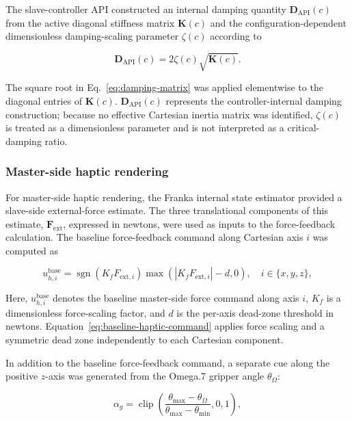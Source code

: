 The slave-controller API constructed an internal damping quantity $\mathbf{D}_{\mathrm{API}}(c)$ from the active diagonal stiffness matrix $\mathbf{K}(c)$ and the configuration-dependent dimensionless damping-scaling parameter $\zeta(c)$ according to

\begin{equation}
\label{eq:damping-matrix}
\mathbf{D}_{\mathrm{API}}(c)=2\zeta(c)\sqrt{\mathbf{K}(c)}.
\end{equation}

The square root in Eq.~\eqref{eq:damping-matrix} was applied elementwise to the diagonal entries of $\mathbf{K}(c)$. $\mathbf{D}_{\mathrm{API}}(c)$ represents the controller-internal damping construction; because no effective Cartesian inertia matrix was identified, $\zeta(c)$ is treated as a dimensionless parameter and is not interpreted as a critical-damping ratio.

\subsubsection{Master-side haptic rendering}
For master-side haptic rendering, the Franka internal state estimator provided a slave-side external-force estimate. The three translational components of this estimate, $\mathbf{F}_{\mathrm{ext}}$, expressed in newtons, were used as inputs to the force-feedback calculation. The baseline force-feedback command along Cartesian axis $i$ was computed as

\begin{equation}
\label{eq:baseline-haptic-command}
u_{h,i}^{\mathrm{base}}=
\operatorname{sgn}\!\left(K_fF_{\mathrm{ext},i}\right)
\max\!\left(\left|K_fF_{\mathrm{ext},i}\right|-d,0\right),
\quad i\in\{x,y,z\},
\end{equation}

Here, $u_{h,i}^{\mathrm{base}}$ denotes the baseline master-side force command along axis $i$, $K_f$ is a dimensionless force-scaling factor, and $d$ is the per-axis dead-zone threshold in newtons. Equation~\eqref{eq:baseline-haptic-command} applies force scaling and a symmetric dead zone independently to each Cartesian component.

In addition to the baseline force-feedback command, a separate cue along the positive $z$-axis was generated from the Omega.7 gripper angle $\theta_{\Omega}$:

\begin{equation}
\label{eq:gripper-cue-activation}
\alpha_g=\operatorname{clip}\!\left(
\frac{\theta_{\max}-\theta_{\Omega}}
{\theta_{\max}-\theta_{\min}},0,1\right),
\end{equation}

